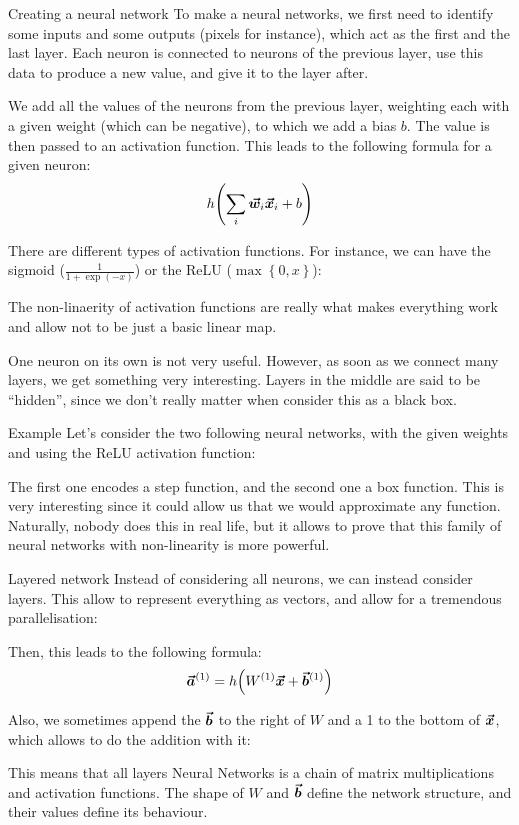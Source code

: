 \documentclass[a4paper]{article}
\begin{document}
\begin{parag}{Creating a neural network}
    To make a neural networks, we first need to identify some inputs and some outputs (pixels for instance), which act as the first and the last layer. Each neuron is connected to neurons of the previous layer, use this data to produce a new value, and give it to the layer after.

    We add all the values of the neurons from the previous layer, weighting each with a given weight (which can be negative), to which we add a bias $b$. The value is then passed to an activation function. This leads to the following formula for a given neuron: 
    \[h\left(\sum_{i} \bvec{w}_i \bvec{x}_i + b\right)\]

    There are different types of activation functions. For instance, we can have the sigmoid ($\frac{1}{1 + \exp\left(-x\right)}$) or the ReLU ($\max\left\{0, x\right\}$):

    The non-linaerity of activation functions are really what makes everything work and allow not to be just a basic linear map. 

    One neuron on its own is not very useful. However, as soon as we connect many layers, we get something very interesting. Layers in the middle are said to be ``hidden'', since we don't really matter when consider this as a black box.
\end{parag}

\begin{parag}{Example}
    Let's consider the two following neural networks, with the given weights and using the ReLU activation function:

    The first one encodes a step function, and the second one a box function. This is very interesting since it could allow us that we would approximate any function. Naturally, nobody does this in real life, but it allows to prove that this family of neural networks with non-linearity is more powerful.
\end{parag}

\begin{parag}{Layered network}
    Instead of considering all neurons, we can instead consider layers. This allow to represent everything as vectors, and allow for a tremendous parallelisation:

    Then, this leads to the following formula: 
    \[\bvec{a}^{\left(1\right)} = h\left(W^{\left(1\right)} \bvec{x} + \bvec{b}^{\left(1\right)}\right)\]

    Also, we sometimes append the $\bm{\protect\vec{b}}$ to the right of $W$ and a 1 to the bottom of $\bm{\protect\vec{x}}$, which allows to do the addition with it:
    
    This means that all layers Neural Networks is a chain of matrix multiplications and activation functions. The shape of $W$ and $\bm{\protect\vec{b}}$ define the network structure, and their values define its behaviour.
\end{parag}
\end{document}
